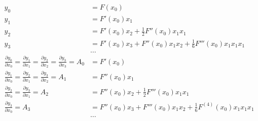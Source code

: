 \documentclass[12pt,oneside,a4paper]{article}
\begin{document}
\begin{center}
\begin{minipage}[h]{160mm}
\small
\begin{align*}
  y_0 & = F\left(x_0\right) \\
  y_1 & = F'\left(x_0\right) x_1 \\
  y_2 & = F'\left(x_0\right) x_2 + \frac{1}{2}F''\left(x_0\right)x_1 x_1 \\
  y_3 & = F'\left(x_0\right) x_3 + F''\left(x_0\right)x_1 x_2
          + \frac{1}{6}F'''\left(x_0\right)x_1 x_1 x_1\\
  & \ldots\\
  \frac{\partial y_0}{\partial x_0} =
  \frac{\partial y_1}{\partial x_1} =
  \frac{\partial y_2}{\partial x_2} =
  \frac{\partial y_3}{\partial x_3} =
  A_0 & = F'\left(x_0\right) \\
  \frac{\partial y_1}{\partial x_0} =
  \frac{\partial y_2}{\partial x_1} =
  \frac{\partial y_3}{\partial x_2} =
  A_1 & = F''\left(x_0\right) x_1 \\
  \frac{\partial y_2}{\partial x_0} =
  \frac{\partial y_3}{\partial x_1} =
  A_2 & = F''\left(x_0\right) x_2 + \frac{1}{2}F'''\left(x_0\right)x_1 x_1 \\
  \frac{\partial y_3}{\partial x_0} =
  A_3 & = F''\left(x_0\right) x_3 + F'''\left(x_0\right)x_1 x_2
          + \frac{1}{6}F^{(4)}\left(x_0\right)x_1 x_1 x_1 \\
  & \ldots
\end{align*}


\end{minipage}
\end{center}
\end{document}
